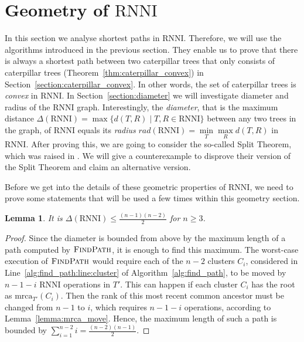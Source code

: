 \documentclass{amsart}
\newcommand{\mrca}{\mathrm{mrca}}
\newcommand{\rnni}{\mathrm{RNNI}}
\newcommand{\findpath}{\textsc{FindPath}}
\newtheorem{lemma}[definition]{Lemma}
\begin{document}
\section{Geometry of $\rnni$}
\label{section:geometry}

In this section we analyse shortest paths in $\rnni$.
Therefore, we will use the algorithms introduced in the previous section.
They enable us to prove that there is always a shortest path between two caterpillar trees that only consists of caterpillar trees (Theorem~\ref{thm:caterpillar_convex}) in Section~\ref{section:caterpillar_convex}.
In other words, the set of caterpillar trees is \emph{convex} in $\rnni$.
In Section~\ref{section:diameter} we will investigate diameter and radius of the $\rnni$ graph.
Interestingly, the \emph{diameter}, that is the maximum distance $\Delta(\rnni) = \max \{d(T, R) \mid T, R \in \rnni\}$ between any two trees in the graph, of $\rnni$ equals its \emph{radius} $rad(\rnni) =  \min\limits_T \max\limits_R d(T,R)$ in $\rnni$.
After proving this, we are going to consider the so-called Split Theorem, which was raised in \autocite{Gavryushkin2018-ol}.
We will give a counterexample to disprove their version of the Split Theorem and claim an alternative version.

Before we get into the details of these geometric properties of $\rnni$, we need to prove some statements that will be used a few times within this geometry section.

\begin{lemma}
    It is $\Delta(\rnni) \leq \frac{(n-1)(n-2)}{2}$ for $n \geq 3$.
    \label{lemma:diameter_bound}
\end{lemma}

\begin{proof}
Since the diameter is bounded from above by the maximum length of a path computed by $\findpath$, it is enough to find this maximum.
The worst-case execution of $\findpath$ would require each of the $n-2$ clusters $C_i$, considered in Line~\ref{alg:find_path:line:cluster} of Algorithm~\ref{alg:find_path}, to be moved by $n-1-i$ $\rnni$ operations in $T'$.
This can happen if each cluster $C_i$ has the root as $\mrca_{T'}(C_i)$.
Then the rank of this most recent common ancestor must be changed from $n-1$ to $i$, which requires $n-1-i$ operations, according to Lemma~\ref{lemma:mrca_move}.
Hence, the maximum length of such a path is bounded by $\sum\limits_{i = 1}^{n-2} i = \frac{(n-2)(n-1)}{2}$.
\end{proof}
\end{document}
